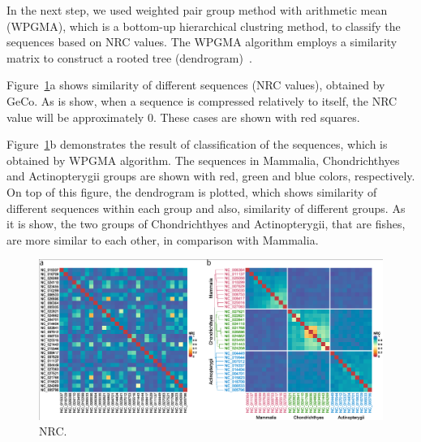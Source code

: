 \documentclass[extendedabs]{recpad2k}
\begin{document}
In the next step, we used weighted pair group method with arithmetic mean (WPGMA), which is a bottom-up hierarchical clustring method, to classify the sequences based on NRC values. The WPGMA algorithm employs a similarity matrix to construct a rooted tree (dendrogram)~\cite{sokal58a, clifford2011comparison}.

Figure~\ref{fig.nrc}a shows similarity of different sequences (NRC values), obtained by GeCo. As is show, when a sequence is compressed relatively to itself, the NRC value will be approximately 0. These cases are shown with red squares.

Figure~\ref{fig.nrc}b demonstrates the result of classification of the sequences, which is obtained by WPGMA algorithm. The sequences in Mammalia, Chondrichthyes and Actinopterygii groups are shown with red, green and blue colors, respectively. On top of this figure, the dendrogram is plotted, which shows similarity of different sequences within each group and also, similarity of different groups. As it is show, the two groups of Chondrichthyes and Actinopterygii, that are fishes, are more similar to each other, in comparison with Mammalia.

\begin{figure}
   \includegraphics[width=\textwidth]{fig.pdf}
   \caption{NRC.}
   \label{fig.nrc}
\end{figure}



\end{document}
